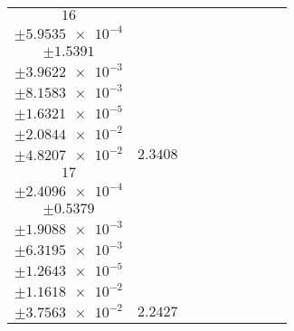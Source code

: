 \documentclass[8pt]{article}
\begin{document}
\begin{longtable}[l]{c c c c c c c c c}
$\num{16}$ & \begin{tabular}[c]{@{}c@{}}$\num{2.7539e-2}$ \\ $\pm\num{5.9535e-4}$\end{tabular} & \begin{tabular}[c]{@{}c@{}}$\num{-0.3402}$ \\ $\pm\num{1.5391}$\end{tabular} & \begin{tabular}[c]{@{}c@{}}$\num{0.85633}$ \\ $\pm\num{3.9622e-3}$\end{tabular} & \begin{tabular}[c]{@{}c@{}}$\num{3.6276e+3}$ \\ $\pm\num{8.1583e-3}$\end{tabular} & \begin{tabular}[c]{@{}c@{}}$\num{7.2571}$ \\ $\pm\num{1.6321e-5}$\end{tabular} & \begin{tabular}[c]{@{}c@{}}$\num{1.1451}$ \\ $\pm\num{2.0844e-2}$\end{tabular} & \begin{tabular}[c]{@{}c@{}}$\num{4.1002}$ \\ $\pm\num{4.8207e-2}$\end{tabular} & $\num{2.3408}$\\
$\num{17}$ & \begin{tabular}[c]{@{}c@{}}$\num{2.6892e-2}$ \\ $\pm\num{2.4096e-4}$\end{tabular} & \begin{tabular}[c]{@{}c@{}}$\num{0.84776}$ \\ $\pm\num{0.5379}$\end{tabular} & \begin{tabular}[c]{@{}c@{}}$\num{7.029}$ \\ $\pm\num{1.9088e-3}$\end{tabular} & \begin{tabular}[c]{@{}c@{}}$\num{3.6337e+3}$ \\ $\pm\num{6.3195e-3}$\end{tabular} & \begin{tabular}[c]{@{}c@{}}$\num{7.2694}$ \\ $\pm\num{1.2643e-5}$\end{tabular} & \begin{tabular}[c]{@{}c@{}}$\num{1.1251}$ \\ $\pm\num{1.1618e-2}$\end{tabular} & \begin{tabular}[c]{@{}c@{}}$\num{4.0407}$ \\ $\pm\num{3.7563e-2}$\end{tabular} & $\num{2.2427}$\\

\end{longtable}
\end{document}
